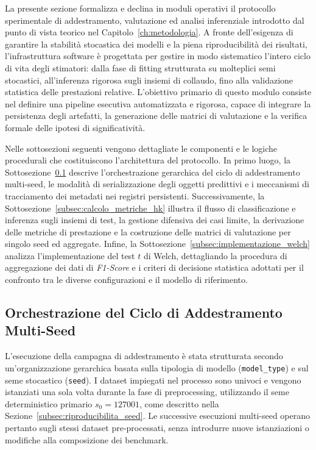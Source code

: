 La presente sezione formalizza e declina in moduli operativi il protocollo sperimentale di addestramento, valutazione ed analisi inferenziale introdotto dal punto di vista teorico nel Capitolo~\ref{ch:metodologia}.
A fronte dell'esigenza di garantire la stabilità stocastica dei modelli e la piena riproducibilità dei risultati, l'infrastruttura software è progettata per gestire in modo sistematico l'intero ciclo di vita degli stimatori: dalla fase di fitting strutturata su molteplici semi stocastici, all'inferenza rigorosa sugli insiemi di collaudo, fino alla validazione statistica delle prestazioni relative.
L'obiettivo primario di questo modulo consiste nel definire una pipeline esecutiva automatizzata e rigorosa, capace di integrare la persistenza degli artefatti, la generazione delle matrici di valutazione e la verifica formale delle ipotesi di significatività.

Nelle sottosezioni seguenti vengono dettagliate le componenti e le logiche procedurali che costituiscono l'architettura del protocollo.
In primo luogo, la Sottosezione~\ref{subsec:orchestrazione_training} descrive l'orchestrazione gerarchica del ciclo di addestramento multi-seed, le modalità di serializzazione degli oggetti predittivi e i meccanismi di tracciamento dei metadati nei registri persistenti.
Successivamente, la Sottosezione~\ref{subsec:calcolo_metriche_hk} illustra il flusso di classificazione e inferenza sugli insiemi di test, la gestione difensiva dei casi limite, la derivazione delle metriche di prestazione e la costruzione delle matrici di valutazione per singolo seed ed aggregate.
Infine, la Sottosezione~\ref{subsec:implementazione_welch} analizza l'implementazione del test $t$ di Welch, dettagliando la procedura di aggregazione dei dati di \textit{F1-Score} e i criteri di decisione statistica adottati per il confronto tra le diverse configurazioni e il modello di riferimento.

\subsection{Orchestrazione del Ciclo di Addestramento Multi-Seed}
\label{subsec:orchestrazione_training}

L'esecuzione della campagna di addestramento è stata strutturata secondo un'organizzazione gerarchica basata sulla tipologia di modello (\texttt{model\_type}) e sul seme stocastico (\texttt{seed}). 
I dataset impiegati nel processo sono univoci e vengono istanziati una sola volta durante la fase di preprocessing, utilizzando il seme deterministico primario $s_0 = 127001$, come descritto nella Sezione~\ref{subsec:riproducibilita_seed}. 
Le successive esecuzioni multi-seed operano pertanto sugli stessi dataset pre-processati, senza introdurre nuove istanziazioni o modifiche alla composizione dei benchmark.

